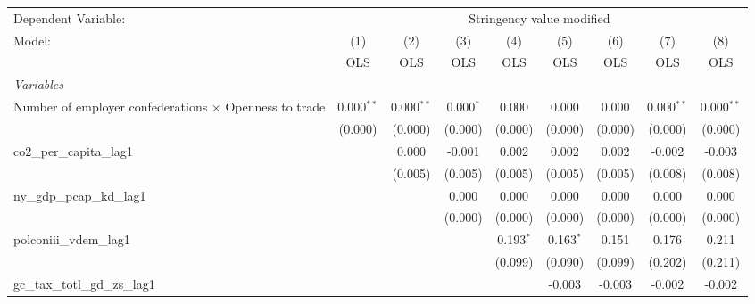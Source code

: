 
\begingroup
\centering
\begin{tabular}{lcccccccc}
   \toprule
   Dependent Variable: & \multicolumn{8}{c}{Stringency value modified}\\
   Model:                                                        & (1)          & (2)          & (3)         & (4)         & (5)         & (6)     & (7)          & (8)\\  
                                                                 &  OLS         & OLS          & OLS         & OLS         & OLS         & OLS     & OLS          & OLS\\  
   \midrule
   \emph{Variables}\\
   Number of employer confederations $\times$ Openness to trade  & 0.000$^{**}$ & 0.000$^{**}$ & 0.000$^{*}$ & 0.000       & 0.000       & 0.000   & 0.000$^{**}$ & 0.000$^{**}$\\   
                                                                 & (0.000)      & (0.000)      & (0.000)     & (0.000)     & (0.000)     & (0.000) & (0.000)      & (0.000)\\   
   co2\_per\_capita\_lag1                                        &              & 0.000        & -0.001      & 0.002       & 0.002       & 0.002   & -0.002       & -0.003\\   
                                                                 &              & (0.005)      & (0.005)     & (0.005)     & (0.005)     & (0.005) & (0.008)      & (0.008)\\   
   ny\_gdp\_pcap\_kd\_lag1                                       &              &              & 0.000       & 0.000       & 0.000       & 0.000   & 0.000        & 0.000\\   
                                                                 &              &              & (0.000)     & (0.000)     & (0.000)     & (0.000) & (0.000)      & (0.000)\\   
   polconiii\_vdem\_lag1                                         &              &              &             & 0.193$^{*}$ & 0.163$^{*}$ & 0.151   & 0.176        & 0.211\\   
                                                                 &              &              &             & (0.099)     & (0.090)     & (0.099) & (0.202)      & (0.211)\\   
   gc\_tax\_totl\_gd\_zs\_lag1                                   &              &              &             &             & -0.003      & -0.003  & -0.002       & -0.002\\   

\end{tabular}
